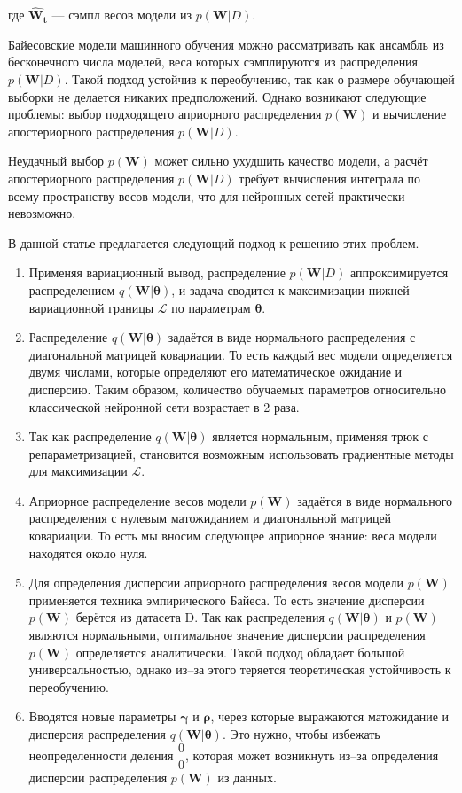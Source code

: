 \documentclass{article}
\begin{document}
где $\pmb{\hat{W}_{t}}$ --- сэмпл весов модели из $p(\pmb{W}| D)$.

Байесовские модели машинного обучения можно рассматривать как ансамбль из бесконечного числа моделей, веса которых сэмплируются из распределения $p(\pmb{W}| D)$. Такой подход устойчив к переобучению, так как о размере обучающей выборки не делается никаких предположений. Однако возникают следующие проблемы: выбор подходящего априорного распределения $p(\pmb{W})$ и вычисление апостериорного распределения $p(\pmb{W}| D)$.

Неудачный выбор $p(\pmb{W})$ может сильно ухудшить качество модели, а расчёт апостериорного распределения $p(\pmb{W}| D)$ требует вычисления интеграла по всему пространству весов модели, что для нейронных сетей практически невозможно.

В данной статье предлагается следующий подход к решению этих проблем.

\begin{enumerate}
 \item Применяя вариационный вывод, распределение $p(\pmb{W}| D)$ аппроксимируется распределением $q(\pmb{W} | \pmb{\theta})$, и задача сводится к максимизации нижней вариационной границы $\mathcal{L}$ по параметрам $\pmb{\theta}$.
 \item Распределение $q(\pmb{W} | \pmb{\theta})$ задаётся в виде нормального распределения с диагональной матрицей ковариации. То есть каждый вес модели определяется двумя числами, которые определяют его математическое ожидание и дисперсию. Таким образом, количество обучаемых параметров относительно классической нейронной сети возрастает в 2 раза.
 \item Так как распределение $q(\pmb{W} | \pmb{\theta})$ является нормальным, применяя трюк с репараметризацией, становится возможным использовать градиентные методы для максимизации $\mathcal{L}$.
 \item Априорное распределение весов модели $p(\pmb{W})$ задаётся в виде нормального распределения с нулевым матожиданием и диагональной матрицей ковариации. То есть мы вносим следующее априорное знание: веса модели находятся около нуля.
 \item Для определения дисперсии априорного распределения весов модели $p(\pmb{W})$ применяется техника эмпирического Байеса. То есть значение дисперсии $p(\pmb{W})$ берётся из датасета D. Так как распределения $q(\pmb{W} | \pmb{\theta})$ и $p(\pmb{W})$ являются нормальными, оптимальное значение дисперсии распределения $p(\pmb{W})$ определяется аналитически. Такой подход обладает большой универсальностью, однако из--за этого теряется теоретическая устойчивость к переобучению.
 \item Вводятся новые параметры $\pmb{\gamma}$ и $\pmb{\rho}$, через которые выражаются матожидание и дисперсия распределения $q(\pmb{W} | \pmb{\theta})$. Это нужно, чтобы избежать неопределенности деления $\dfrac{0}{0}$, которая может возникнуть из--за определения дисперсии распределения $p(\pmb{W})$ из данных.
\end{enumerate}
\end{document}
